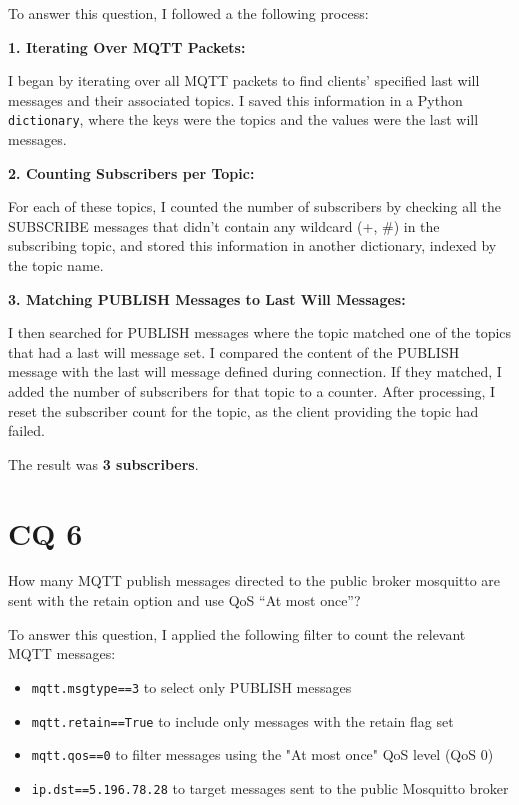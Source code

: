 \documentclass{Configuration_Files/PoliMi3i_thesis}
\begin{document}
To answer this question, I followed a the following process:

\textbf{1. Iterating Over MQTT Packets:}

I began by iterating over all MQTT packets to find clients' specified last will messages and their associated topics. I saved this information in a Python \texttt{dictionary}, where the keys were the topics and the values were the last will messages.

\textbf{2. Counting Subscribers per Topic:}

For each of these topics, I counted the number of subscribers by checking all the SUBSCRIBE messages that didn't contain any wildcard (+, \#) in the subscribing topic, and stored this information in another dictionary, indexed by the topic name.

\textbf{3. Matching PUBLISH Messages to Last Will Messages:}

I then searched for PUBLISH messages where the topic matched one of the topics that had a last will message set. I compared the content of the PUBLISH message with the last will message defined during connection. If they matched, I added the number of subscribers for that topic to a counter. After processing, I reset the subscriber count for the topic, as the client providing the topic had failed.

The result was \textbf{3 subscribers}.



\chapter{CQ 6}
\begin{tcolorbox}[questionbox]
    How many MQTT publish messages directed to the public broker mosquitto are sent with the retain option and use QoS “At most once”?
\end{tcolorbox}

To answer this question, I applied the following filter to count the relevant MQTT messages:
\begin{itemize}
    \item \texttt{mqtt.msgtype==3} to select only PUBLISH messages
    \item \texttt{mqtt.retain==True} to include only messages with the retain flag set
    \item \texttt{mqtt.qos==0} to filter messages using the "At most once" QoS level (QoS 0)
    \item \texttt{ip.dst==5.196.78.28} to target messages sent to the public Mosquitto broker
\end{itemize}
\end{document}
